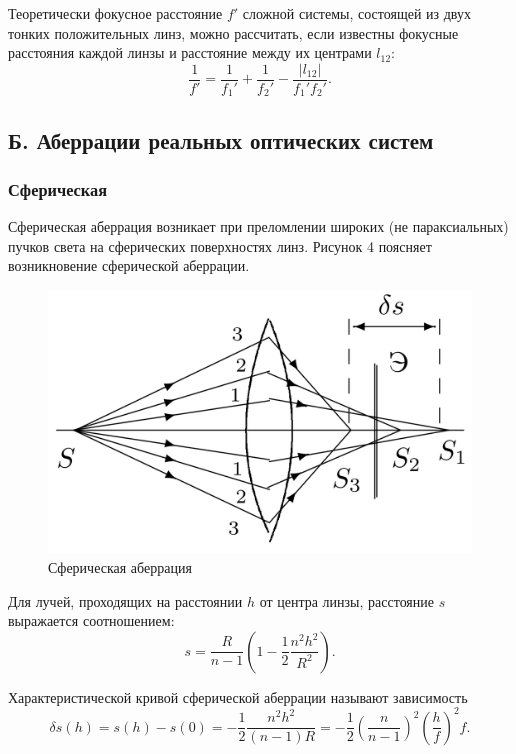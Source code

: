 \documentclass[a4paper,12pt]{article} %
\begin{document}
	\newpage
	Теоретически фокусное расстояние $f'$ сложной системы, состоящей из двух тонких положительных линз, можно рассчитать, если известны фокусные расстояния каждой линзы и расстояние между их центрами $l_{12}$:
	\begin{equation*}
		\frac{1}{f'} = \frac{1}{f_1'} + \frac{1}{f_2'} - \frac{|l_{12}|}{f_1'f_2'}.
	\end{equation*}

	\subsection*{Б. Аберрации реальных оптических систем}
	
	\subsubsection*{Сферическая}
	Сферическая аберрация возникает при преломлении широких (не параксиальных) пучков света на сферических поверхностях линз. Рисунок 4 поясняет возникновение сферической аберрации.
	
	\begin{figure}[h!]
		\centering
		\includegraphics[scale=0.5]{Pictures/Сфер}
		\caption{Сферическая аберрация}
	\end{figure}

	Для лучей, проходящих на расстоянии $h$ от центра линзы, расстояние $s$ выражается соотношением:
	\begin{equation*}
		s = \frac{R}{n - 1}\left(1 - \frac{1}{2} \frac{n^2 h^2}{R^2}\right).
	\end{equation*}

	Характеристической кривой сферической аберрации называют зависимость 
	\begin{equation*}
		\delta s(h) = s(h) - s(0) = -\frac{1}{2}\frac{n^2 h^2}{(n - 1)R} = -\frac{1}{2}\left(\frac{n}{n - 1}\right)^2 \left(\frac{h}{f}\right)^2 f.
	\end{equation*}
\end{document}
